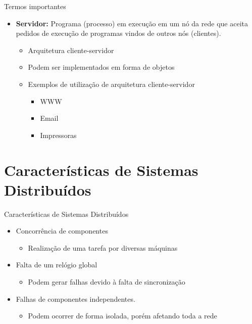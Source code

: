 \documentclass[aspectratio=169,
				xcolor=table]{beamer}
\begin{document}
	\begin{frame}{Termos importantes}
		\begin{itemize}
			\item \textbf{Servidor:} Programa (processo) em execução em um nó da rede que aceita pedidos de execução de programas vindos de outros nós (clientes).
			\begin{itemize}
				\item Arquitetura cliente-servidor
				\item Podem ser implementados em forma de objetos
				\item Exemplos de utilização de arquitetura cliente-servidor
				\begin{itemize}
					\item WWW
					\item Email
					\item Impressoras
				\end{itemize}
			\end{itemize}
		\end{itemize}

	\end{frame}	
	
	\section{Características de Sistemas Distribuídos}

	\begin{frame}{Características de Sistemas Distribuídos}
		\begin{itemize}
			\item Concorrência de componentes
			\begin{itemize}
				\item Realização de uma tarefa por diversas máquinas
			\end{itemize}
			\vspace{1em}
			\item Falta de um relógio global 
			\begin{itemize}
				\item Podem gerar falhas devido à falta de sincronização
			\end{itemize}
			\vspace{1em}
			\item Falhas de componentes independentes.
			\begin{itemize}
				\item Podem ocorrer de forma isolada, porém afetando toda a rede
			\end{itemize}
		\end{itemize}
	\end{frame}
	
\end{document}
